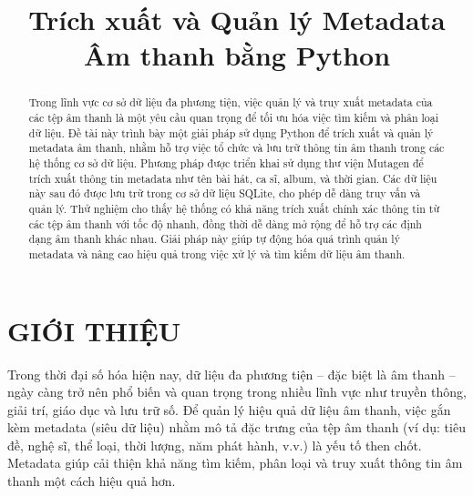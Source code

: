 \documentclass[conference]{IEEEtran}
\begin{document}
\title{Trích xuất và Quản lý Metadata Âm thanh bằng Python}

\author{
}

\maketitle

\begin{abstract}
Trong lĩnh vực cơ sở dữ liệu đa phương tiện, việc quản lý và truy xuất metadata của các tệp âm thanh 
là một yêu cầu quan trọng để tối ưu hóa việc tìm kiếm và phân loại dữ liệu. 
Đề tài này trình bày một giải pháp sử dụng Python để trích xuất và quản lý metadata âm thanh, 
nhằm hỗ trợ việc tổ chức và lưu trữ thông tin âm thanh trong các hệ thống cơ sở dữ liệu. 
Phương pháp được triển khai sử dụng thư viện Mutagen để trích xuất thông tin metadata 
như tên bài hát, ca sĩ, album, và thời gian. Các dữ liệu này sau đó được lưu trữ trong cơ sở dữ liệu SQLite, 
cho phép dễ dàng truy vấn và quản lý. Thử nghiệm cho thấy hệ thống có khả năng trích xuất chính xác 
thông tin từ các tệp âm thanh với tốc độ nhanh, đồng thời dễ dàng mở rộng để hỗ trợ các định dạng âm thanh khác nhau. 
Giải pháp này giúp tự động hóa quá trình quản lý metadata và nâng cao hiệu quả trong việc xử lý và tìm kiếm dữ liệu âm thanh.
\end{abstract}

\section{GIỚI THIỆU}
Trong thời đại số hóa hiện nay, dữ liệu đa phương tiện – đặc biệt là âm thanh – 
ngày càng trở nên phổ biến và quan trọng trong nhiều lĩnh vực như truyền thông, giải trí, giáo dục và lưu trữ số. 
Để quản lý hiệu quả dữ liệu âm thanh, việc gắn kèm metadata (siêu dữ liệu) nhằm mô tả đặc trưng của tệp âm thanh 
(ví dụ: tiêu đề, nghệ sĩ, thể loại, thời lượng, năm phát hành, v.v.) là yếu tố then chốt. 
Metadata giúp cải thiện khả năng tìm kiếm, phân loại và truy xuất thông tin âm thanh một cách hiệu quả hơn.
\end{document}
